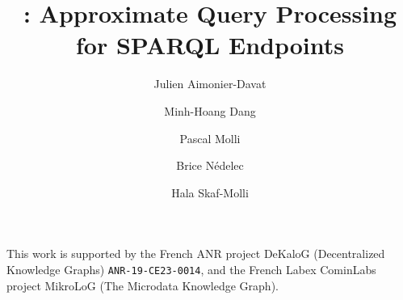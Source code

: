 \documentclass{ceurart}
\title{\NAME: Approximate Query Processing\\for SPARQL Endpoints}
\author[1]{Julien Aimonier-Davat}[%
  orcid=0000-0001-6707-0204,
  email=name@example.com,
]
\author[1]{Minh-Hoang Dang}[%
  email=name@example.com,
]
\author[1]{Pascal Molli}[%
  orcid=0000-0001-8048-273X,
]
\author[1]{Brice N{\'e}delec}[%
]
\author[1]{Hala Skaf-Molli}[%
  orcid=0000-0003-1062-6659,
]
\begin{document}


\maketitle






\begin{acknowledgments}
  This work is supported by the French ANR project DeKaloG
  (Decentralized Knowledge Graphs) \texttt{ANR-19-CE23-0014}, and the
  French Labex CominLabs project MikroLoG (The Microdata Knowledge
  Graph).
\end{acknowledgments}


\end{document}
